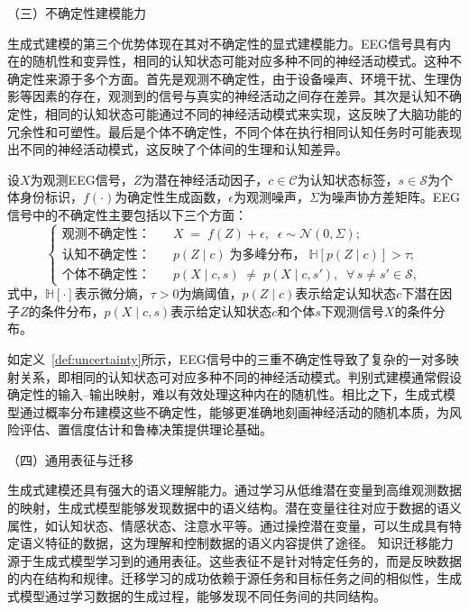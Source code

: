 （三）不确定性建模能力

生成式建模的第三个优势体现在其对不确定性的显式建模能力。EEG信号具有内在的随机性和变异性，相同的认知状态可能对应多种不同的神经活动模式。这种不确定性来源于多个方面。首先是观测不确定性，由于设备噪声、环境干扰、生理伪影等因素的存在，观测到的信号与真实的神经活动之间存在差异。其次是认知不确定性，相同的认知状态可能通过不同的神经活动模式来实现，这反映了大脑功能的冗余性和可塑性。最后是个体不确定性，不同个体在执行相同认知任务时可能表现出不同的神经活动模式，这反映了个体间的生理和认知差异。

\begin{definition}[EEG信号中的不确定性]
\label{def:uncertainty}
设$X$为观测EEG信号，$Z$为潜在神经活动因子，$c \in \mathcal{C}$为认知状态标签，$s \in \mathcal{S}$为个体身份标识，$f(\cdot)$为确定性生成函数，$\epsilon$为观测噪声，$\Sigma$为噪声协方差矩阵。EEG信号中的不确定性主要包括以下三个方面：
\begin{equation}
\label{eq:uncertainty}
\left\{
\begin{aligned}
\text{观测不确定性：}&\quad X \;=\; f(Z) + \epsilon,\;\; \epsilon \sim \mathcal{N}(0,\Sigma);\\
\text{认知不确定性：}&\quad p(Z\mid c)\;\text{为多峰分布，}\; \mathbb{H}[p(Z\mid c)] > \tau;\\
\text{个体不确定性：}&\quad p(X\mid c,s) \;\neq\; p(X\mid c,s'),\;\; \forall\, s\neq s' \in \mathcal{S},
\end{aligned}
\right.
\end{equation}
式中，$\mathbb{H}[\cdot]$表示微分熵，$\tau > 0$为熵阈值，$p(Z\mid c)$表示给定认知状态$c$下潜在因子$Z$的条件分布，$p(X\mid c,s)$表示给定认知状态$c$和个体$s$下观测信号$X$的条件分布。
\end{definition}

如定义~\ref{def:uncertainty}所示，EEG信号中的三重不确定性导致了复杂的一对多映射关系，即相同的认知状态可对应多种不同的神经活动模式。判别式建模通常假设确定性的输入--输出映射，难以有效处理这种内在的随机性。相比之下，生成式模型通过概率分布建模这些不确定性，能够更准确地刻画神经活动的随机本质，为风险评估、置信度估计和鲁棒决策提供理论基础。

（四）通用表征与迁移

生成式建模还具有强大的语义理解能力。通过学习从低维潜在变量到高维观测数据的映射，生成式模型能够发现数据中的语义结构。潜在变量往往对应于数据的语义属性，如认知状态、情感状态、注意水平等。通过操控潜在变量，可以生成具有特定语义特征的数据，这为理解和控制数据的语义内容提供了途径。
知识迁移能力源于生成式模型学习到的通用表征。这些表征不是针对特定任务的，而是反映数据的内在结构和规律。迁移学习的成功依赖于源任务和目标任务之间的相似性，生成式模型通过学习数据的生成过程，能够发现不同任务间的共同结构。

